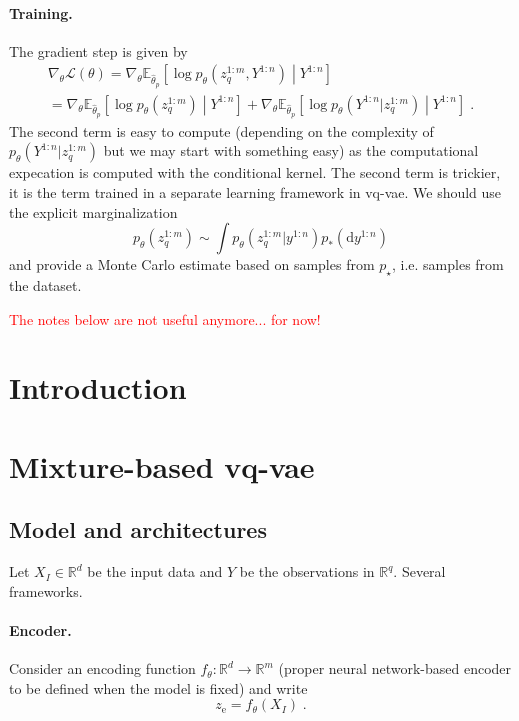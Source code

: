 \documentclass{article}
\newcommand{\rset}{\ensuremath{\mathbb{R}}}
\newcommand{\rmd}{\ensuremath{\mathrm{d}}}
\newcommand{\eqsp}{\;}
\newcommand{\rme}{\mathrm{e}}
\begin{document}
\paragraph{Training.}
The gradient step is given by
\begin{multline*}
\nabla_\theta\mathcal{L}(\theta) = \nabla_\theta \mathbb{E}_{\hat{\theta}_p}\left[\log p_{\theta}(z^{1:m}_q,Y^{1:n})  \middle | Y^{1:n}\right] \\
=  \nabla_\theta \mathbb{E}_{\hat{\theta}_p}\left[\log p_{\theta}(z^{1:m}_q)  \middle | Y^{1:n}\right]  + \nabla_\theta \mathbb{E}_{\hat{\theta}_p}\left[\log p_{\theta}(Y^{1:n}|z^{1:m}_q)  \middle | Y^{1:n}\right]\eqsp.
\end{multline*}
The second term is easy to compute (depending on the complexity of $ p_{\theta}(Y^{1:n}|z^{1:m}_q)$ but we may start with something easy) as the computational expecation is computed with the conditional kernel. The second term is trickier, it is the term trained in a separate learning framework in vq-vae. We should use the explicit marginalization
$$
 p_{\theta}(z^{1:m}_q) \sim \int p_{\theta}(z^{1:m}_q|y^{1:n})p_*(\rmd y^{1:n})
$$
and provide a Monte Carlo estimate based on samples from $p_\star$, i.e. samples from the dataset.



\clearpage
\newpage
\textcolor{red}{The notes below are not useful anymore... for now!}


\section{Introduction}
\label{sec:intro}

\section{Mixture-based vq-vae}
\label{sec:model:mixture}
\subsection{Model and architectures}
Let $X_I \in \rset^d$ be the input data and $Y$ be the observations in $\rset^q$.  Several frameworks.

\paragraph{Encoder.} Consider an encoding function $f_\theta: \rset^d \to \rset^{m}$ (proper neural network-based encoder  to be defined when the model is fixed) and write
$$
z_\rme = f_\theta(X_I)\eqsp.
$$
\end{document}
